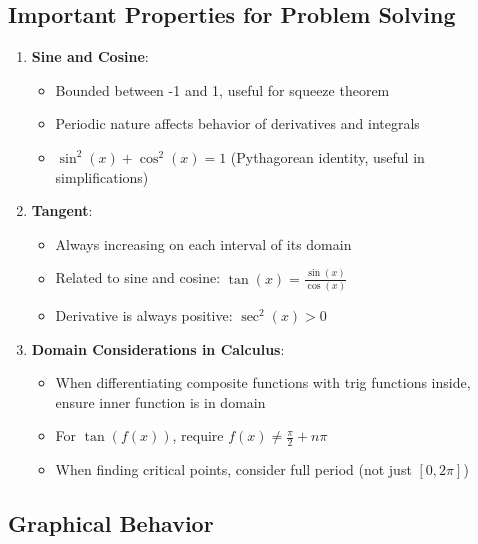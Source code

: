 \documentclass[../main-notes.tex]{subfile}
\begin{document}
\subsection*{Important Properties for Problem Solving}

\begin{enumerate}
    \item \textbf{Sine and Cosine}:
    \begin{itemize}
        \item Bounded between -1 and 1, useful for squeeze theorem
        \item Periodic nature affects behavior of derivatives and integrals
        \item \(\sin^2(x) + \cos^2(x) = 1\) (Pythagorean identity, useful in simplifications)
    \end{itemize}
    
    \item \textbf{Tangent}:
    \begin{itemize}
        \item Always increasing on each interval of its domain
        \item Related to sine and cosine: \( \tan(x) = \frac{\sin(x)}{\cos(x)} \)
        \item Derivative is always positive: \( \sec^2(x) > 0 \)
    \end{itemize}
    
    \item \textbf{Domain Considerations in Calculus}:
    \begin{itemize}
        \item When differentiating composite functions with trig functions inside, ensure inner function is in domain
        \item For \(\tan(f(x))\), require \( f(x) \neq \frac{\pi}{2} + n\pi \)
        \item When finding critical points, consider full period (not just \([0, 2\pi]\))
    \end{itemize}
\end{enumerate}

\subsection*{Graphical Behavior}
\end{document}
